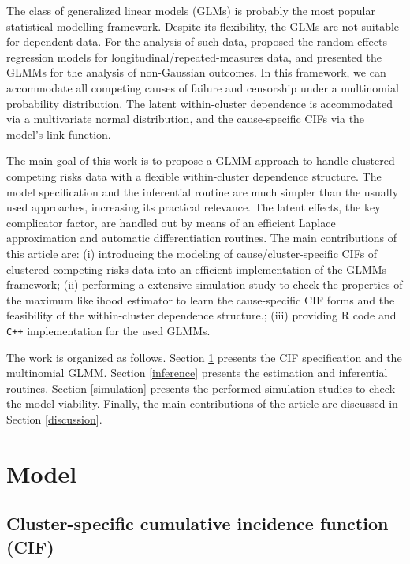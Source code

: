 \documentclass[a4paper,12pt]{article}
\begin{document}
The class of generalized linear models (GLMs) \citep{GLM72} is probably
the most popular statistical modelling framework. Despite its
flexibility, the GLMs are not suitable for dependent data. For the
analysis of such data, \cite{laird82} proposed the random effects
regression models for longitudinal/repeated-measures data, and
\cite{breslow93} presented the GLMMs for the analysis of non-Gaussian
outcomes. In this framework, we can accommodate all competing causes of
failure and censorship under a multinomial probability distribution. The
latent within-cluster dependence is accommodated via a multivariate
normal distribution, and the cause-specific CIFs via the model's link
function.

The main goal of this work is to propose a GLMM approach to handle
clustered competing risks data with a flexible within-cluster dependence
structure. The model specification and the inferential routine are much
simpler than the usually used approaches, increasing its practical
relevance. The latent effects, the key complicator factor, are handled
out by means of an efficient Laplace approximation and automatic
differentiation routines. The main contributions of this article are:
(i) introducing the modeling of cause/cluster-specific CIFs of clustered
competing risks data into an efficient implementation of the GLMMs
framework; (ii) performing a extensive simulation study to check the
properties of the maximum likelihood estimator to learn the
cause-specific CIF forms and the feasibility of the within-cluster
dependence structure.; (iii) providing R code and \texttt{C++}
implementation for the used GLMMs.

The work is organized as follows. Section \ref{model} presents the CIF
specification and the multinomial GLMM. Section \ref{inference} presents
the estimation and inferential routines. Section \ref{simulation}
presents the performed simulation studies to check the model
viability. Finally, the main contributions of the article are discussed
in Section \ref{discussion}.

\section{Model}
\label{model}

\subsection{Cluster-specific cumulative incidence function (CIF)}
\label{CIF}
\end{document}
